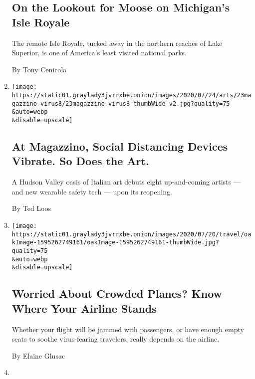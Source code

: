\begin{enumerate}
  \hypertarget{on-the-lookout-for-moose-on-michigans-isle-royale}{%
  \subsection{On the Lookout for Moose on Michigan's Isle
  Royale}\label{on-the-lookout-for-moose-on-michigans-isle-royale}}

  The remote Isle Royale, tucked away in the northern reaches of Lake
  Superior, is one of America's least visited national parks.

  By Tony Cenicola
\item
  \href{/2020/07/22/arts/design/magazzino-art-social-distancing-virus.html}{}

  \texttt{[image: https://static01.graylady3jvrrxbe.onion/images/2020/07/24/arts/23magazzino-virus8/23magazzino-virus8-thumbWide-v2.jpg?quality=75\\\&auto=webp\\\&disable=upscale]}

  \hypertarget{at-magazzino-social-distancing-devices-vibrate-so-does-the-art}{%
  \subsection{At Magazzino, Social Distancing Devices Vibrate. So Does
  the
  Art.}\label{at-magazzino-social-distancing-devices-vibrate-so-does-the-art}}

  A Hudson Valley oasis of Italian art debuts eight up-and-coming
  artists --- and new wearable safety tech --- upon its reopening.

  By Ted Loos
\item
  \href{/2020/07/21/travel/crowded-flights-coronavirus.html}{}

  \texttt{[image: https://static01.graylady3jvrrxbe.onion/images/2020/07/20/travel/oakImage-1595262749161/oakImage-1595262749161-thumbWide.jpg?quality=75\\\&auto=webp\\\&disable=upscale]}

  \hypertarget{worried-about-crowded-planes-know-where-your-airline-stands}{%
  \subsection{Worried About Crowded Planes? Know Where Your Airline
  Stands}\label{worried-about-crowded-planes-know-where-your-airline-stands}}

  Whether your flight will be jammed with passengers, or have enough
  empty seats to soothe virus-fearing travelers, really depends on the
  airline.

  By Elaine Glusac
\item
  \href{/2020/07/20/world/asia/bali-tourism-coronavirus.html}{}


\end{enumerate}
